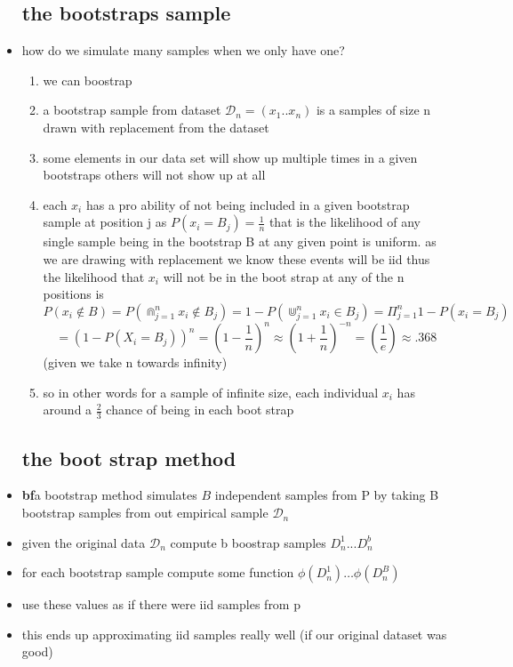 \documentclass{article}
\begin{document}
\begin{itemize}
\subsection*{the bootstraps sample}
\item how do we simulate many samples when we only have one?
\begin{enumerate}
    \item we can boostrap
    \item a bootstrap sample from dataset $\mathcal{D}_{n}=(x_1..x_n)$ is a samples of size n drawn with replacement from the dataset 
    \item some elements in our data set will show up multiple times in a given bootstraps others will not show up at all 
    \item each $x_i$ has a pro ability of not being included in a given bootstrap sample at position j as  $P(x_i= B_j)=\frac{1}{n}$ that is the likelihood of any single sample being in the bootstrap B at any given point is uniform. as we are drawing with replacement we know these events will be iid thus the likelihood that $x_i$ will not be in the boot strap at any of the n positions is  $$P(x_i\not \in B)=P(\Cap_{j=1}^{n}x_i\not \in B_j)=1-P(\Cup_{j=1}^{n}x_i\in B_j)=\Pi_{j=1}^{n}1-P(x_i=B_j)$$ 
    $$=(1-P(X_i=B_j))^{n}=(1-\frac{1}{n})^{n}\approx (1+\frac{1}{n})^{-n}=(\frac{1}{e})\approx .368 $$ (given we take n towards infinity)
    \item so in other words for a sample of infinite size, each individual $x_i$ has around a $\frac{2}{3}$ chance of being in each boot strap
\end{enumerate}
\subsection*{the boot strap method}
\item \textbf{bf}{a bootstrap method } simulates $B$ independent samples from P by taking B bootstrap samples from out empirical sample $\mathcal{D}_{n}$
\item given the original data $\mathcal{D}_{n}$ compute b boostrap samples $D_n^1...D_n^b$
\item for each bootstrap sample compute some function $\phi(D_{n}^{1})\dots \phi(D_{n}^{B})$
\item use these values as if there were iid samples from p 
\item this ends up approximating iid samples really well (if our original dataset was good)

\end{itemize}
\end{document}
